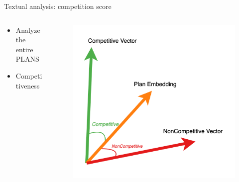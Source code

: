 \documentclass[10pt, aspectratio=169]{beamer}
\begin{document}
\begin{frame}[fragile]{Textual analysis: competition score}

\begin{columns}
    \begin{column}{0.5\textwidth}
    \begin{itemize}
        \item Analyze the entire PLANS
        \item Competitiveness 
    \end{itemize}
    
        
    \end{column}
    \begin{column}{0.5\textwidth}
        \begin{figure}
            \centering
            \includegraphics[width=0.9\linewidth]{latex//slides_pricing_collusion/textual_analysis_vector_illustration.png}
        \end{figure}
        
    \end{column}
\end{columns}


\end{frame}
\end{document}

